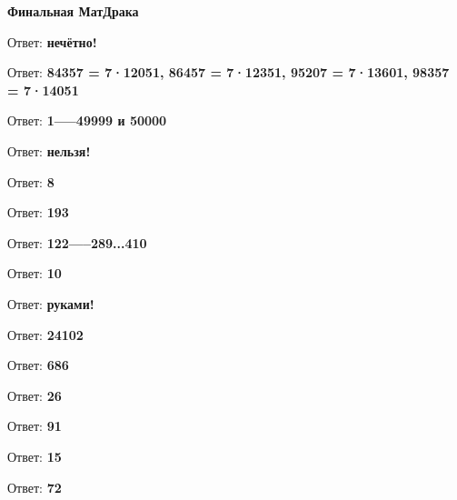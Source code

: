 \centerline{\bf \Huge Финальная МатДрака}

Ответ: \textbf{нечётно!}

Ответ: \textbf{84357 = 7·12051,  86457 = 7·12351,  95207 = 7·13601,  98357 = 7·14051}

Ответ: \textbf{1-----49999 и 50000}

Ответ: \textbf{нельзя!}

Ответ: \textbf{8}

Ответ: \textbf{193}

Ответ: \textbf{122-----289...410}

Ответ: \textbf{10}

Ответ: \textbf{руками!}

Ответ: \textbf{24102}

Ответ: \textbf{686}

Ответ: \textbf{26}

Ответ: \textbf{91}

Ответ: \textbf{15}

Ответ: \textbf{72}
